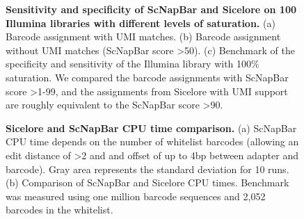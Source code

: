 \documentclass[times, 11pt, a4paper]{article}
\begin{document}
\begin{figure}[h!]
     \centering
     \begin{subfigure}[t]{0.65\textwidth}
         \centering
     \end{subfigure}
     \hfill
     \begin{subfigure}[t]{0.3\textwidth}
         \centering
      \end{subfigure}
        \caption{\textbf{Sensitivity and specificity of ScNapBar and Sicelore on 100 Illumina libraries with different levels of saturation.} (a) Barcode assignment with UMI matches. (b) Barcode assignment without UMI matches (ScNapBar score \textgreater 50). (c) Benchmark of the specificity and sensitivity of the Illumina library with 100\% saturation. We compared the barcode assignments with ScNapBar score \textgreater 1-99, and the assignments from Sicelore with UMI support are roughly equivalent to the ScNapBar score \textgreater 90. }
         \label{fig:umimetrics}
\end{figure}
    
\begin{figure}[h!]
     \centering
     \begin{subfigure}[t]{0.35\textwidth}
         \caption{}
         \label{fig:cpu-rt}
         \centering
     \end{subfigure}
     \hfill
     \begin{subfigure}[t]{0.55\textwidth}
         \caption{}
         \label{fig:ctime-sis}
         \centering
     \end{subfigure}
        \caption{\textbf{Sicelore and ScNapBar CPU time comparison.} (a) ScNapBar CPU time depends on the number of whitelist barcodes (allowing an edit distance of  \textgreater 2 and and offset of up to 4bp between adapter and barcode). Gray area represents the standard deviation for 10 runs. (b) Comparison of ScNapBar and Sicelore CPU times. Benchmark was measured using one million barcode sequences and 2,052 barcodes in the whitelist. }
        \label{fig:runtime}
\end{figure}
\end{document}
